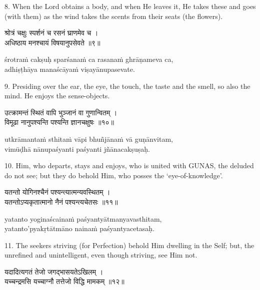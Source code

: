 8. When the Lord obtains a body, and when He leaves it, He takes these and goes
(with them) as the wind takes the scents from their seats (the flowers).

\begin{gitaverse}
श्रोत्रं चक्षुः स्पर्शनं च रसनं घ्राणमेव च । \\
अधिष्ठाय मनश्चायं विषयानुपसेवते ॥९॥
\end{gitaverse}

\begin{transliteration}
śrotraṁ cakṣuḥ sparśanaṁ ca rasanaṁ ghrāṇameva ca, \\
adhiṣṭhāya manaścāyaṁ viṣayānupasevate.
\end{transliteration}

9. Presiding over the ear, the eye, the touch, the taste and the smell, so also
the mind. He enjoys the sense-objects.

\begin{gitaverse}
उत्क्रामन्तं स्थितं वापि भुञ्जानं वा गुणान्वितम् । \\
विमूढा नानुपश्यन्ति पश्यन्ति ज्ञानचक्षुषः ॥१०॥
\end{gitaverse}

\begin{transliteration}
utkrāmantaṁ sthitaṁ vāpi bhuñjānaṁ vā guṇānvitam, \\
vimūḍhā nānupaśyanti paśyanti jñānacakṣuṣaḥ.
\end{transliteration}

10. Him, who departs, stays and enjoys, who is united with GUNAS, the deluded
do not see; but they do behold Him, who posses the `eye-of-knowledge'.

\begin{gitaverse}
यतन्तो योगिनश्चैनं पश्यन्त्यात्मन्यवस्थितम् । \\
यतन्तोऽप्यकृतात्मानो नैनं पश्यन्त्यचेतसः ॥११॥
\end{gitaverse}

\begin{transliteration}
yatanto yoginaścainaṁ paśyantyātmanyavasthitam, \\
yatanto'pyakṛtātmāno nainaṁ paśyantyacetasaḥ.
\end{transliteration}

11. The seekers striving (for Perfection) behold Him dwelling in the Self; but,
the unrefined and unintelligent, even though striving, see Him not.

\begin{gitaverse}
यदादित्यगतं तेजो जगद्भासयतेऽखिलम् । \\
यच्चन्द्रमसि यच्चाग्नौ तत्तेजो विद्धि मामकम् ॥१२॥
\end{gitaverse}

